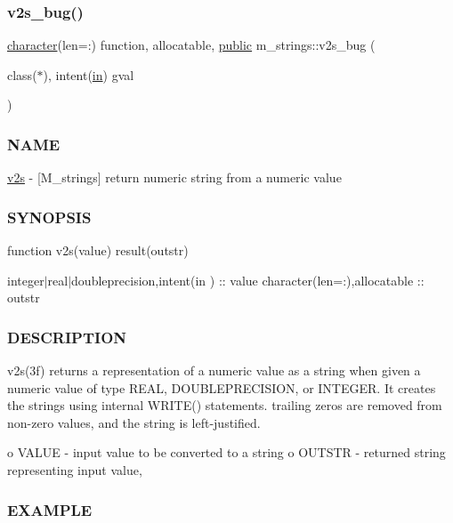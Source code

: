 \subsubsection{\texorpdfstring{v2s\+\_\+bug()}{v2s\_bug()}}
{\footnotesize\ttfamily \hyperlink{option__stopwatch_83_8txt_abd4b21fbbd175834027b5224bfe97e66}{character}(len=\+:) function, allocatable, \hyperlink{M__stopwatch_83_8txt_a2f74811300c361e53b430611a7d1769f}{public} m\+\_\+strings\+::v2s\+\_\+bug (\begin{DoxyParamCaption}\item[{class($\ast$), intent(\hyperlink{M__journal_83_8txt_afce72651d1eed785a2132bee863b2f38}{in})}]{gval }\end{DoxyParamCaption})}



\subsubsection*{N\+A\+ME}

\hyperlink{interfacem__strings_1_1v2s}{v2s} -\/ \mbox{[}M\+\_\+strings\mbox{]} return numeric string from a numeric value \subsubsection*{S\+Y\+N\+O\+P\+S\+IS}

function v2s(value) result(outstr)

integer$\vert$real$\vert$doubleprecision,intent(in ) \+:\+: value character(len=\+:),allocatable \+:\+: outstr \subsubsection*{D\+E\+S\+C\+R\+I\+P\+T\+I\+ON}

\begin{DoxyVerb}v2s(3f) returns a representation of a numeric value as a string when
given a numeric value of type REAL, DOUBLEPRECISION, or INTEGER. It
creates the strings using internal WRITE() statements.  trailing zeros
are removed from non-zero values, and the string is left-justified.

   o  VALUE - input value to be converted to a string
   o  OUTSTR - returned string representing input value,
\end{DoxyVerb}
 \subsubsection*{E\+X\+A\+M\+P\+LE}

